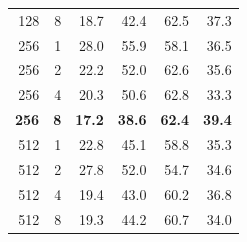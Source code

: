 \documentclass[12pt,oneside]{book} %
\begin{document}
\begin{table}[H]
\begin{adjustbox}{width=0.8\textwidth}
\begin{tabular}{rrrrrr}
            128                  & 8                     & 18.7               & 42.4               & 62.5               & 37.3               \\
            256                  & 1                     & 28.0               & 55.9               & 58.1               & 36.5               \\
            256                  & 2                     & 22.2               & 52.0               & 62.6               & 35.6               \\
            256                  & 4                     & 20.3               & 50.6               & 62.8               & 33.3               \\
            \textbf{256}         & \textbf{8}            & \textbf{17.2}      & \textbf{38.6}      & \textbf{62.4}      & \textbf{39.4}      \\
            512                  & 1                     & 22.8               & 45.1               & 58.8               & 35.3               \\
            512                  & 2                     & 27.8               & 52.0               & 54.7               & 34.6               \\
            512                  & 4                     & 19.4               & 43.0               & 60.2               & 36.8               \\
            512                  & 8                     & 19.3               & 44.2               & 60.7               & 34.0               \\
            \bottomrule
        \end{tabular}
    \end{adjustbox}
    \label{tab:new-dataset-adjusted-header}
\end{table}

\newpage
\end{document}
